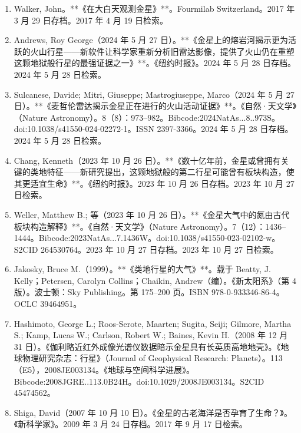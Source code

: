 \begin{enumerate}
\item Walker, John。**《在大白天观测金星》**。Fourmilab Switzerland。2017 年 3 月 29 日存档。2017 年 4 月 19 日检索。

\item Andrews, Roy George（2024 年 5 月 27 日）。**《金星上的熔岩河揭示更为活跃的火山行星——新软件让科学家重新分析旧雷达影像，提供了火山仍在重塑这颗地狱般行星的最强证据之一》**。《纽约时报》。2024 年 5 月 28 日存档。2024 年 5 月 28 日检索。

\item Sulcanese, Davide; Mitri, Giuseppe; Mastrogiuseppe, Marco（2024 年 5 月 27 日）。**《麦哲伦雷达揭示金星正在进行的火山活动证据》**。《自然·天文学》（Nature Astronomy）。8（8）：973–982。Bibcode:2024NatAs...8..973S。doi:10.1038/s41550-024-02272-1。ISSN 2397-3366。2024 年 5 月 28 日存档。2024 年 5 月 28 日检索。

\item Chang, Kenneth（2023 年 10 月 26 日）。**《数十亿年前，金星或曾拥有关键的类地特征——新研究提出，这颗地狱般的第二行星可能曾有板块构造，使其更适宜生命》**。《纽约时报》。2023 年 10 月 26 日存档。2023 年 10 月 27 日检索。

\item Weller, Matthew B.; 等（2023 年 10 月 26 日）。**《金星大气中的氮由古代板块构造解释》**。《自然·天文学》（Nature Astronomy）。7（12）：1436–1444。Bibcode:2023NatAs...7.1436W。doi:10.1038/s41550-023-02102-w。S2CID 264530764。2023 年 10 月 27 日存档。2023 年 10 月 27 日检索。

\item Jakosky, Bruce M.（1999）。**《类地行星的大气》**。载于 Beatty, J. Kelly；Petersen, Carolyn Collins；Chaikin, Andrew（编）。《新太阳系》（第 4 版）。波士顿：Sky Publishing。第 175–200 页。ISBN 978-0-933346-86-4。OCLC 39464951。

\item Hashimoto, George L.; Roos-Serote, Maarten; Sugita, Seiji; Gilmore, Martha S.; Kamp, Lucas W.; Carlson, Robert W.; Baines, Kevin H.（2008 年 12 月 31 日）。《伽利略近红外成像光谱仪数据暗示金星具有长英质高地地壳》。《地球物理研究杂志：行星》（Journal of Geophysical Research: Planets）。113（E5），2008JE003134。《地球与空间科学进展》。Bibcode:2008JGRE..113.0B24H。doi:10.1029/2008JE003134。S2CID 45474562。

\item Shiga, David（2007 年 10 月 10 日）。《金星的古老海洋是否孕育了生命？》。《新科学家》。2009 年 3 月 24 日存档。2017 年 9 月 17 日检索。


\end{enumerate}
